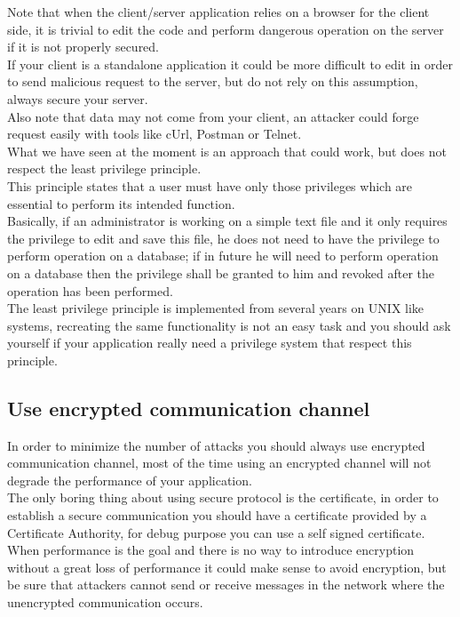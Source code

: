 Note that when the client/server application relies on a browser for the client side, it is trivial to edit the code and perform dangerous operation on the server if it is not properly secured.\\
If your client is a standalone application it could be more difficult to edit in order to send malicious request to the server, but do not rely on this assumption, always secure your server.\\
Also note that data may not come from your client, an attacker could forge request easily with tools like cUrl, Postman or Telnet.\\
What we have seen at the moment is an approach that could work, but does not respect the least privilege principle.\\
This principle states that a user must have only those privileges which are essential to perform its intended function.\\
Basically, if an administrator is working on a simple text file and it only requires the privilege to edit and save this file, he does not need to have the privilege to perform operation on a database; if in future he will need to perform operation on a database then the privilege shall be granted to him and revoked after the operation has been performed.\\
The least privilege principle is implemented from several years on UNIX like systems, recreating the same functionality is not an easy task and you should ask yourself if your application really need a privilege system that respect this principle.

\subsection{Use encrypted communication channel}
In order to minimize the number of attacks you should always use encrypted communication channel, most of the time
using an encrypted channel will not degrade the performance of your application.\\
The only boring thing about using secure protocol is the certificate, in order to establish a secure communication you should have
a certificate provided by a Certificate Authority, for debug purpose you can use a self signed certificate.\\

When performance is the goal and there is no way to introduce encryption without a great loss of performance it could make sense
to avoid encryption, but be sure that attackers cannot send or receive messages in the network where the unencrypted communication occurs.\\

